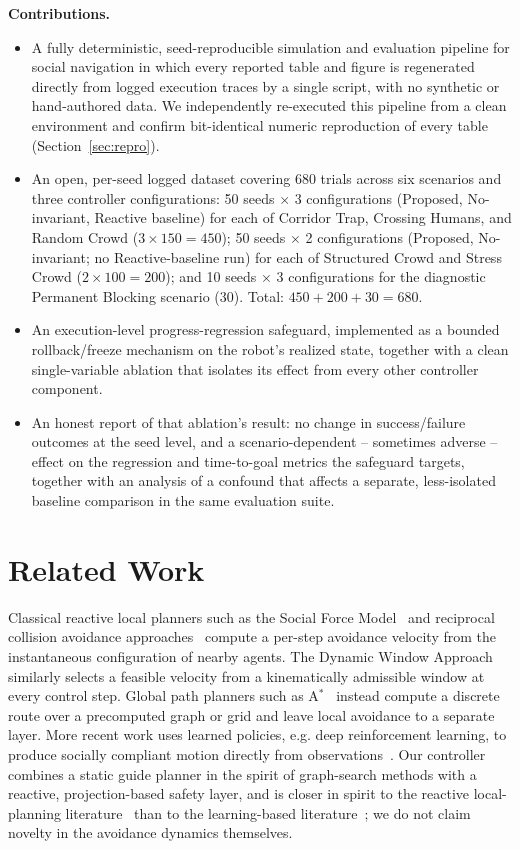 \documentclass[conference,letterpaper,10pt]{ieeeconf}
\begin{document}
\textbf{Contributions.}
\begin{itemize}
  \item A fully deterministic, seed-reproducible simulation and evaluation
  pipeline for social navigation in which every reported table and figure
  is regenerated directly from logged execution traces by a single
  script, with no synthetic or hand-authored data. We independently
  re-executed this pipeline from a clean environment and confirm
  bit-identical numeric reproduction of every table (Section~\ref{sec:repro}).
  \item An open, per-seed logged dataset covering 680 trials across six
  scenarios and three controller configurations: 50 seeds $\times$ 3
  configurations (Proposed, No-invariant, Reactive baseline) for each of
  Corridor Trap, Crossing Humans, and Random Crowd ($3 \times 150 = 450$);
  50 seeds $\times$ 2 configurations (Proposed, No-invariant; no
  Reactive-baseline run) for each of Structured Crowd and Stress Crowd
  ($2 \times 100 = 200$); and 10 seeds $\times$ 3 configurations for the
  diagnostic Permanent Blocking scenario ($30$). Total: $450+200+30=680$.
  \item An execution-level progress-regression safeguard, implemented as a
  bounded rollback/freeze mechanism on the robot's realized state, together
  with a clean single-variable ablation that isolates its effect from every
  other controller component.
  \item An honest report of that ablation's result: no change in
  success/failure outcomes at the seed level, and a scenario-dependent --
  sometimes adverse -- effect on the regression and time-to-goal metrics
  the safeguard targets, together with an analysis of a confound that
  affects a separate, less-isolated baseline comparison in the same
  evaluation suite.
\end{itemize}

\section{Related Work}

Classical reactive local planners such as the Social Force
Model~\cite{social_force} and reciprocal collision avoidance
approaches~\cite{orca} compute a per-step avoidance velocity from the
instantaneous configuration of nearby agents. The Dynamic Window
Approach~\cite{dwa} similarly selects a feasible velocity from a
kinematically admissible window at every control step. Global path
planners such as A$^\ast$~\cite{A_star} instead compute a discrete route
over a precomputed graph or grid and leave local avoidance to a separate
layer. More recent work uses learned policies, e.g. deep reinforcement
learning, to produce socially compliant motion directly from
observations~\cite{RL_navigation}. Our controller combines a static guide
planner in the spirit of graph-search methods with a reactive,
projection-based safety layer, and is closer in spirit to the reactive
local-planning literature~\cite{social_force,orca,dwa} than to the
learning-based literature~\cite{RL_navigation}; we do not claim novelty in
the avoidance dynamics themselves.
\end{document}
